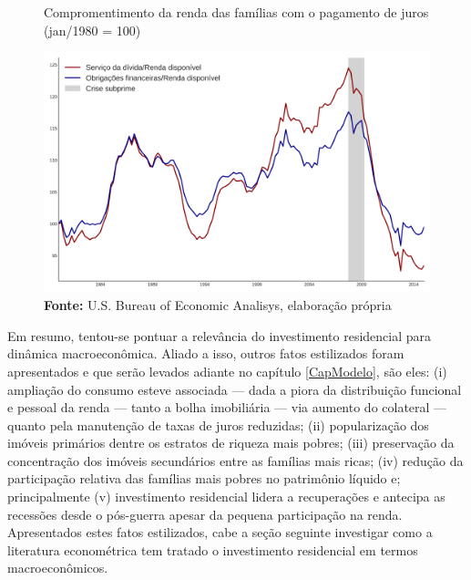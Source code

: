 \begin{figure}[H]
	\centering
	\caption{Compromentimento da renda das famílias com o pagamento de juros (jan/1980 = 100)}
	\label{FigServDiv}
	\includegraphics[width=\textwidth]{../../Dados/Fatos_Estilizados/figs/Serv_Divida.png}
	\caption*{\textbf{Fonte:} U.S. Bureau of Economic Analisys, elaboração própria}
\end{figure}


Em resumo, tentou-se pontuar a relevância do investimento residencial para dinâmica macroeconômica.
Aliado a isso, outros fatos estilizados foram apresentados e que serão levados adiante no capítulo \ref{CapModelo}, são eles:
	(i) ampliação do consumo esteve associada --- dada a piora da distribuição funcional e pessoal da renda --- tanto a bolha imobiliária --- via aumento do colateral --- quanto pela manutenção de taxas de juros reduzidas;
	(ii) popularização dos imóveis primários dentre os estratos de riqueza mais pobres;
	(iii) preservação da concentração dos imóveis secundários entre as famílias mais ricas;
	(iv) redução da participação relativa das famílias mais pobres no patrimônio líquido e; principalmente 
	(v) investimento residencial lidera a recuperações e antecipa as recessões desde o pós-guerra apesar da pequena participação na renda.
Apresentados estes fatos estilizados, cabe a seção seguinte investigar como a literatura econométrica tem tratado o investimento residencial em termos macroeconômicos.

